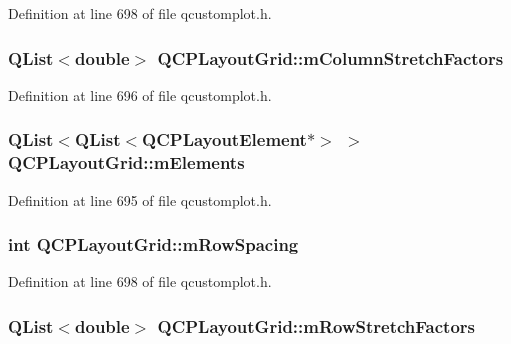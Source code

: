 Definition at line 698 of file qcustomplot.\-h.

\hypertarget{class_q_c_p_layout_grid_ac6aabe62339f94f18b9f8adab94b1840}{
\subsubsection[{m\-Column\-Stretch\-Factors}]{\setlength{\rightskip}{0pt plus 5cm}Q\-List$<$double$>$ Q\-C\-P\-Layout\-Grid\-::m\-Column\-Stretch\-Factors\hspace{0.3cm}{\ttfamily [protected]}}}\label{class_q_c_p_layout_grid_ac6aabe62339f94f18b9f8adab94b1840}


Definition at line 696 of file qcustomplot.\-h.

\hypertarget{class_q_c_p_layout_grid_a3577d3855bf8ad20ef9079291a49f397}{
\subsubsection[{m\-Elements}]{\setlength{\rightskip}{0pt plus 5cm}Q\-List$<$Q\-List$<${\bf Q\-C\-P\-Layout\-Element}$\ast$$>$ $>$ Q\-C\-P\-Layout\-Grid\-::m\-Elements\hspace{0.3cm}{\ttfamily [protected]}}}\label{class_q_c_p_layout_grid_a3577d3855bf8ad20ef9079291a49f397}


Definition at line 695 of file qcustomplot.\-h.

\hypertarget{class_q_c_p_layout_grid_a8b67f183f4645739cc4c794d75843b40}{
\subsubsection[{m\-Row\-Spacing}]{\setlength{\rightskip}{0pt plus 5cm}int Q\-C\-P\-Layout\-Grid\-::m\-Row\-Spacing\hspace{0.3cm}{\ttfamily [protected]}}}\label{class_q_c_p_layout_grid_a8b67f183f4645739cc4c794d75843b40}


Definition at line 698 of file qcustomplot.\-h.

\hypertarget{class_q_c_p_layout_grid_a36c85a7eaf342680fb9b8a4977486f16}{
\subsubsection[{m\-Row\-Stretch\-Factors}]{\setlength{\rightskip}{0pt plus 5cm}Q\-List$<$double$>$ Q\-C\-P\-Layout\-Grid\-::m\-Row\-Stretch\-Factors\hspace{0.3cm}{\ttfamily [protected]}}}\label{class_q_c_p_layout_grid_a36c85a7eaf342680fb9b8a4977486f16}


